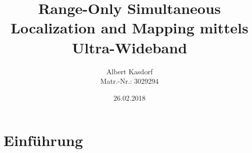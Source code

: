 \documentclass{beamer}
\title[RO-SLAM mittels UWB]{Range-Only Simultaneous Localization and Mapping mittels Ultra-Wideband}
\author[A. Kasdorf]
{
	Albert Kasdorf\\
	Matr.-Nr.: 3029294
}
\institute[FH Aachen]
{
	FH Aachen\\
	Fachbereich Elektrotechnik und Informationstechnik\\
	Ingenieur-Informatik
}
\date{26.02.2018}
\begin{document}
%
%
\frame{\titlepage}


%
%


%
% 
%
\part{Einführung}


%
%
\end{document}
